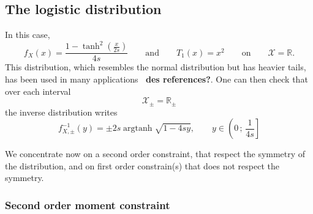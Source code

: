 \documentclass[entropy,article,submit,moreauthors,pdftex]{Definitions/mdpi}
\newcommand{\Avoir}[1]{{\color{red}\bf #1}}                                  %
\def\Rset{\mathbb{R}}%
\def\X{\mathcal{X}}%
\def\argtanh{\operatorname{argtanh}}%
\begin{document}

\subsection{The logistic distribution}
\label{subsecapp:Logistic}

In this case, 
%
\[
f_X(x)  = \frac{1  -  \tanh^2\!\left(\frac{x}{2s}\right)}{4s} \qquad  \mbox{and}
\qquad T_1(x) = x^2 \qquad \mbox{on} \qquad \X = \Rset.
\]
This  distribution, which  resembles  the normal  distribution  but has  heavier
tails,   has    been   used   in   many    applications~\Avoir{\cite{toto}   des
  references?}. One can then check that over each interval
%
\[
\X_\pm = \Rset_\pm
\]
%
the inverse distribution writes 
%
\[
f_{X,\pm}^{-1}(y) = \pm 2 s \argtanh \sqrt{1-4sy}, \qquad y \in \left( 0 \, ; \,
  \frac{1}{4s} \right]
\]

We concentrate  now on a second  order constraint, that respect  the symmetry of
the distribution,  and on  first order  constrain(s) that  does not  respect the
symmetry.


\subsubsection{Second order moment constraint}
\label{subsubsecapp:LogisticSecondOrder}
\end{document}

